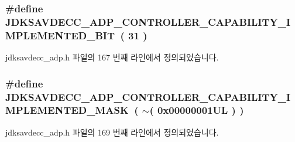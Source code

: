 \subsubsection[{\texorpdfstring{J\+D\+K\+S\+A\+V\+D\+E\+C\+C\+\_\+\+A\+D\+P\+\_\+\+C\+O\+N\+T\+R\+O\+L\+L\+E\+R\+\_\+\+C\+A\+P\+A\+B\+I\+L\+I\+T\+Y\+\_\+\+I\+M\+P\+L\+E\+M\+E\+N\+T\+E\+D\+\_\+\+B\+IT}{JDKSAVDECC_ADP_CONTROLLER_CAPABILITY_IMPLEMENTED_BIT}}]{\setlength{\rightskip}{0pt plus 5cm}\#define J\+D\+K\+S\+A\+V\+D\+E\+C\+C\+\_\+\+A\+D\+P\+\_\+\+C\+O\+N\+T\+R\+O\+L\+L\+E\+R\+\_\+\+C\+A\+P\+A\+B\+I\+L\+I\+T\+Y\+\_\+\+I\+M\+P\+L\+E\+M\+E\+N\+T\+E\+D\+\_\+\+B\+IT~( 31 )}\hypertarget{group__adp__controller__capability_ga34098d8031e7749869b4c2b97d9321af}{}\label{group__adp__controller__capability_ga34098d8031e7749869b4c2b97d9321af}


jdksavdecc\+\_\+adp.\+h 파일의 167 번째 라인에서 정의되었습니다.

\subsubsection[{\texorpdfstring{J\+D\+K\+S\+A\+V\+D\+E\+C\+C\+\_\+\+A\+D\+P\+\_\+\+C\+O\+N\+T\+R\+O\+L\+L\+E\+R\+\_\+\+C\+A\+P\+A\+B\+I\+L\+I\+T\+Y\+\_\+\+I\+M\+P\+L\+E\+M\+E\+N\+T\+E\+D\+\_\+\+M\+A\+SK}{JDKSAVDECC_ADP_CONTROLLER_CAPABILITY_IMPLEMENTED_MASK}}]{\setlength{\rightskip}{0pt plus 5cm}\#define J\+D\+K\+S\+A\+V\+D\+E\+C\+C\+\_\+\+A\+D\+P\+\_\+\+C\+O\+N\+T\+R\+O\+L\+L\+E\+R\+\_\+\+C\+A\+P\+A\+B\+I\+L\+I\+T\+Y\+\_\+\+I\+M\+P\+L\+E\+M\+E\+N\+T\+E\+D\+\_\+\+M\+A\+SK~( $\sim$( 0x00000001\+U\+L ) )}\hypertarget{group__adp__controller__capability_ga120849eebab9fb67e0aa5f1b3646821c}{}\label{group__adp__controller__capability_ga120849eebab9fb67e0aa5f1b3646821c}


jdksavdecc\+\_\+adp.\+h 파일의 169 번째 라인에서 정의되었습니다.

